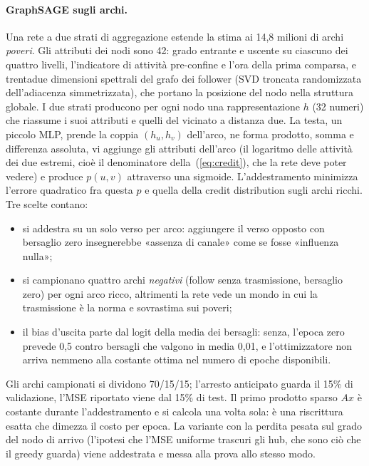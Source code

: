 \documentclass[11pt,a4paper]{article}
\begin{document}
\paragraph{GraphSAGE sugli archi.} Una rete a due strati di aggregazione \citep{hamilton2017} estende la stima ai 14,8 milioni di archi \emph{poveri}. Gli attributi dei nodi sono 42: grado entrante e uscente su ciascuno dei quattro livelli, l'indicatore di attività pre-confine e l'ora della prima comparsa, e trentadue dimensioni spettrali del grafo dei follower (SVD troncata randomizzata \citep{halko2011} dell'adiacenza simmetrizzata), che portano la posizione del nodo nella struttura globale. I due strati producono per ogni nodo una rappresentazione $h$ (32 numeri) che riassume i suoi attributi e quelli del vicinato a distanza due. La testa, un piccolo MLP, prende la coppia $(h_u, h_v)$ dell'arco, ne forma prodotto, somma e differenza assoluta, vi aggiunge gli attributi dell'arco (il logaritmo delle attività dei due estremi, cioè il denominatore della~(\ref{eq:credit}), che la rete deve poter vedere) e produce $p(u,v)$ attraverso una sigmoide. L'addestramento minimizza l'errore quadratico fra questa $p$ e quella della credit distribution sugli archi ricchi. Tre scelte contano:
\begin{itemize}
  \item si addestra su un solo verso per arco: aggiungere il verso opposto con bersaglio zero insegnerebbe «assenza di canale» come se fosse «influenza nulla»;
  \item si campionano quattro archi \emph{negativi} (follow senza trasmissione, bersaglio zero) per ogni arco ricco, altrimenti la rete vede un mondo in cui la trasmissione è la norma e sovrastima sui poveri;
  \item il bias d'uscita parte dal logit della media dei bersagli: senza, l'epoca zero prevede 0,5 contro bersagli che valgono in media 0,01, e l'ottimizzatore non arriva nemmeno alla costante ottima nel numero di epoche disponibili.
\end{itemize}
Gli archi campionati si dividono 70/15/15; l'arresto anticipato guarda il 15\% di validazione, l'MSE riportato viene dal 15\% di test. Il primo prodotto sparso $A x$ è costante durante l'addestramento e si calcola una volta sola: è una riscrittura esatta che dimezza il costo per epoca. La variante con la perdita pesata sul grado del nodo di arrivo (l'ipotesi che l'MSE uniforme trascuri gli hub, che sono ciò che il greedy guarda) viene addestrata e messa alla prova allo stesso modo.
\end{document}
